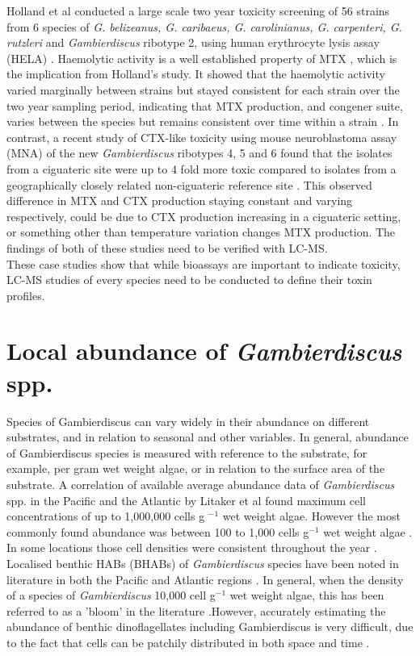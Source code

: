 \documentclass[12pt]{article}
\begin{document}
Holland et al conducted a large scale two year toxicity screening of 56 strains from 6 species of \emph{G. belizeanus, G. caribaeus, G. carolinianus, G. carpenteri, G. rutzleri} and  \emph{Gambierdiscus} ribotype 2, using human erythrocyte lysis assay (HELA) \cite{holland2013differences}. Haemolytic activity is a well established property of MTX \cite{igarashi1999mechanisms}, which is the implication from Holland's study. It showed that the haemolytic activity varied marginally between strains but stayed consistent for each strain over the two year sampling period, indicating that MTX production, and congener suite, varies between the species but remains consistent over time within a strain \cite{holland2013differences}.
In contrast, a recent study of CTX-like toxicity using mouse neuroblastoma assay (MNA) of the new \emph{Gambierdiscus} ribotypes 4, 5 and 6 found that the isolates from a ciguateric site were up to 4\- fold more toxic compared to isolates from a geographically closely related non-ciguateric reference site \cite{xu2014distribution}. This observed difference in MTX and CTX production staying constant and varying respectively, could be due to CTX production increasing in a ciguateric setting, or something other than temperature variation changes MTX production. The findings of both of these studies need to be verified with LC-MS. \\

These case studies show that while bioassays are important to indicate toxicity, LC-MS studies of every species need to be conducted to define their toxin profiles.

\section{Local abundance of \emph{Gambierdiscus} spp.}
Species of Gambierdiscus can vary widely in their abundance on different substrates, and in relation to seasonal and other variables. In general, abundance of Gambierdiscus species is measured with reference to the substrate, for example, per gram wet weight algae, or in relation to the surface area of the substrate. A correlation of available average abundance data of \emph{Gambierdiscus} spp. in the Pacific and the Atlantic by Litaker et al found maximum cell concentrations of up to 1,000,000 cells g $^{-1}$ wet weight algae. However the most commonly found abundance was between 100 to 1,000 cells g$^{-1}$ wet weight algae \cite{litaker2010global}. In some locations those cell densities were consistent throughout the year \cite{chinain1999seasonal}.
Localised benthic HABs (BHABs) of \emph{Gambierdiscus} species have been noted in literature in both the Pacific and Atlantic regions \cite{nakajima1981toxicity,withers1984ciguatera,chinain1999seasonal,darius2007ciguatera}.
In general, when the density of a species of \emph{Gambierdiscus} 10,000 cell g$^{-1}$ wet weight algae, this has been referred to as a 'bloom' in the literature \cite{chinain1999seasonal}.However, accurately estimating the abundance of benthic dinoflagellates including Gambierdiscus is very difficult, due to the fact that cells can be patchily distributed in both space and time \cite{lobel1988assessment,ballantine1988population,litaker2010global}.
\end{document}
